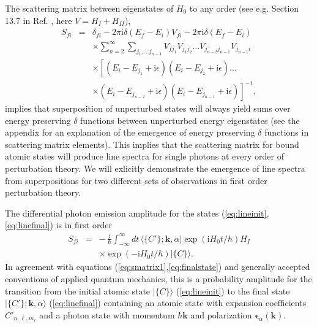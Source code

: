 \documentclass[final,3p,12pt]{elsarticle3}
\begin{document}
The scattering matrix between eigenstates of $H_0$ to any order
(see e.g. Section 13.7 in Ref. \cite{rdqm}, here $V=H_I+H_{II}$),
\begin{eqnarray}\nonumber
S_{\!fi}&=&\delta_{fi}-2\pi\mathrm{i}\delta(E_f-E_i)V_{fi}
-2\pi\mathrm{i}\delta(E_f-E_i)
\\ \nonumber
&&\times\sum_{n=2}^\infty\sum_{j_1,\ldots j_{n-1}}
V_{fj_1}V_{j_1 j_2}\ldots V_{j_{n-2}j_{n-1}}V_{j_{n-1}i}
\\ \nonumber
&&\times
\left[(E_i-E_{j_1}+\mathrm{i}\epsilon)(E_i-E_{j_2}+\mathrm{i}\epsilon)\ldots
\right. 
\\ \label{eq:Snthorder}
&&\times\left.
(E_i-E_{j_{n-2}}+\mathrm{i}\epsilon)(E_i-E_{j_{n-1}}+\mathrm{i}\epsilon)\right]^{-1},
\end{eqnarray}
implies that superposition of unperturbed states will always yield sums over energy 
preserving $\delta$ functions between unperturbed energy eigenstates (see the 
appendix for an explanation of the emergence of energy preserving $\delta$ functions
in scattering matrix elements). This implies 
that the scattering matrix for bound atomic states will produce line spectra for 
single photons at every order of perturbation theory. We will exlicitly demonstrate 
the emergence of line spectra from superpositions for two different sets of 
observations in first order perturbation theory.

The differential photon emission amplitude for the 
states (\ref{eq:lineinit},\ref{eq:linefinal}) is in first order 
\begin{eqnarray}\nonumber
S_{\!fi}&=&-\,\frac{\mathrm{i}}{\hbar}\int_{-\infty}^\infty\!dt\,\bm{\langle}
\{C'\};\bm{k},\alpha\bm{|}\exp(\mathrm{i}H_0t/\hbar)
H_I
\\ \label{eq:line1}
&&\times\exp(-\mathrm{i}H_0t/\hbar)\bm{|}\{C\}\bm{\rangle}.
\end{eqnarray}
In agreement with equations (\ref{eq:smatrix1},\ref{eq:finalstate})
and generally accepted conventions of applied quantum mechanics,
this is a probability amplitude for the transition from the initial
atomic state $\bm{|}\{C\}\bm{\rangle}$ (\ref{eq:lineinit}) to the final 
state $\bm{|}\{C'\};\bm{k},\alpha\bm{\rangle}$ (\ref{eq:linefinal})
containing an atomic state with expansion coefficients $C'_{n,\ell,m_\ell}$ 
and a photon state with momentum $\hbar\bm{k}$ and 
polarization $\bm{\epsilon}_\alpha(\bm{k})$. 
\end{document}

